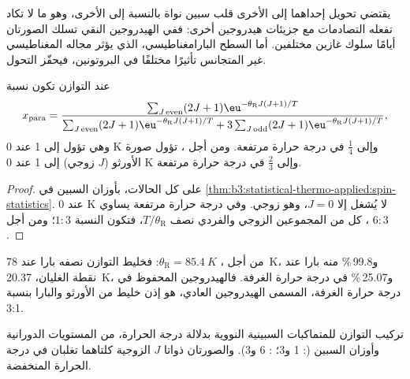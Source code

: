 يقتضي تحويل إحداهما إلى الأخرى قلب سبين نواة بالنسبة إلى
الأخرى، وهو ما لا تكاد تفعله التصادمات مع جزيئات هيدروجين أخرى: ففي الهيدروجين
النقي تسلك الصورتان أيامًا سلوك غازين مختلفين. أما السطح
البارامغناطيسي، الذي يؤثر مجاله المغناطيسي غير المتجانس تأثيرًا مختلفًا في
البروتونين، فيحفّز التحول.

\begin{proposition}\label{prop:b3:statistical-thermo-applied:ortho-para}
عند التوازن تكون نسبة 
\[
  x_{\mathrm{para}} = \frac{\sum_{J\,\mathrm{even}}(2J+1)\eu^{-\theta_{\mathrm R}J(J+1)/T}}
    {\sum_{J\,\mathrm{even}}(2J+1)\eu^{-\theta_{\mathrm R}J(J+1)/T} + 3\sum_{J\,\mathrm{odd}}(2J+1)\eu^{-\theta_{\mathrm R}J(J+1)/T}},
\]
وهي تؤول إلى 1 عند 0 K وإلى $\frac14$ في درجة حرارة مرتفعة. ومن أجل ، تؤول صورة الأورثو
($J$ زوجي) إلى 1 عند 0 K وإلى $\frac23$ في درجة حرارة مرتفعة.
\end{proposition}

\begin{proof}
 على كل الحالات، بأوزان السبين في
\cref{thm:b3:statistical-thermo-applied:spin-statistics}. عند 0 K لا يُشغل إلا $J = 0$، وهو
زوجي. وفي درجة حرارة مرتفعة يساوي كل من المجموعين الزوجي والفردي نصف
$T/\theta_{\mathrm R}$، فتكون النسبة $1 : 3$؛ ومن أجل ، $6 : 3$.
\end{proof}

من أجل ، $\theta_{\mathrm R} = \qty{85.4}{K}$: فخليط التوازن نصفه بارا عند \qty{78}{K}،
و99.8\,\% منه بارا عند نقطة الغليان، \qty{20.37}{K}، و25.07\,\% في درجة حرارة
الغرفة. فالهيدروجين المحفوظ في درجة حرارة الغرفة، المسمى الهيدروجين العادي، هو
إذن خليط من الأورثو والبارا بنسبة 3:1.

\begin{omfigure}

{\small تركيب التوازن للمتماكبات السبينية النووية بدلالة
درجة الحرارة، من المستويات الدورانية وأوزان السبين (: 1 و3؛
: 6 و3). والصورتان ذواتا $J$ الزوجية كلتاهما تغلبان في درجة الحرارة المنخفضة.}
\end{omfigure}

